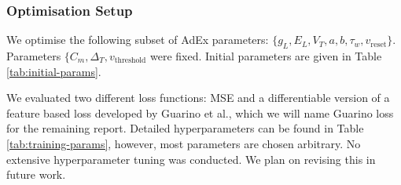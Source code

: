 \documentclass[conference]{IEEEtran}
\begin{document}
\subsubsection{Optimisation Setup}\label{sec:optimization-setup}
We optimise the following subset of \ac{AdEx} parameters: $\{g_L, E_L, V_T, a, b, \tau_w, v_{\text{reset}}\}$.
Parameters $\{C_m, \Delta_T, v_{\text{threshold}}$ were fixed.
Initial parameters are given in Table \ref{tab:initial-params}.

We evaluated two different loss functions: \ac{MSE} and a differentiable version of a feature based loss developed by Guarino et al.\cite{Guarino2025}, which we will name Guarino loss for the remaining report.
Detailed hyperparameters can be found in Table \ref{tab:training-params}, however, most parameters are chosen arbitrary.
No extensive hyperparameter tuning was conducted.
We plan on revising this in future work.
\end{document}
